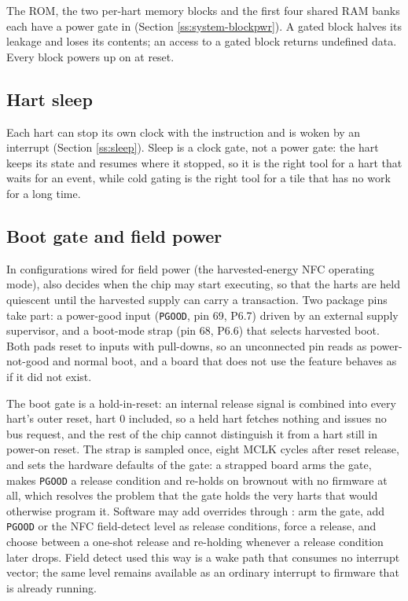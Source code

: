 The ROM, the two per-hart memory blocks and the first four shared RAM banks each have a power gate in  (Section \ref{ss:system-blockpwr}). A gated block halves its leakage and loses its contents; an access to a gated block returns undefined data. Every block powers up on at reset.

\subsection{Hart sleep}

Each hart can stop its own clock with the  instruction and is woken by an interrupt (Section \ref{ss:sleep}). Sleep is a clock gate, not a power gate: the hart keeps its state and resumes where it stopped, so it is the right tool for a hart that waits for an event, while cold gating is the right tool for a tile that has no work for a long time.

\subsection{Boot gate and field power}

In configurations wired for field power (the harvested-energy NFC operating mode),  also decides when the chip may start executing, so that the harts are held quiescent until the harvested supply can carry a transaction. Two package pins take part: a power-good input (\texttt{PGOOD}, pin 69, P6.7) driven by an external supply supervisor, and a boot-mode strap (pin 68, P6.6) that selects harvested boot. Both pads reset to inputs with pull-downs, so an unconnected pin reads as power-not-good and normal boot, and a board that does not use the feature behaves as if it did not exist.

The boot gate is a hold-in-reset: an internal release signal is combined into every hart's outer reset, hart 0 included, so a held hart fetches nothing and issues no bus request, and the rest of the chip cannot distinguish it from a hart still in power-on reset. The strap is sampled once, eight MCLK cycles after reset release, and sets the hardware defaults of the gate: a strapped board arms the gate, makes \texttt{PGOOD} a release condition and re-holds on brownout with no firmware at all, which resolves the problem that the gate holds the very harts that would otherwise program it. Software may add overrides through : arm the gate, add \texttt{PGOOD} or the NFC field-detect level as release conditions, force a release, and choose between a one-shot release and re-holding whenever a release condition later drops. Field detect used this way is a wake path that consumes no interrupt vector; the same level remains available as an ordinary interrupt to firmware that is already running.

